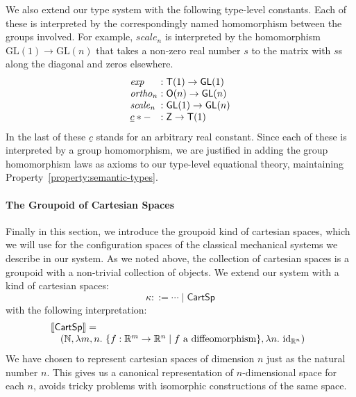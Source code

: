 \documentclass[preprint]{sigplanconf}
\newcommand{\sepbar}{\mathrel|}
\theoremstyle{examplestyle}
\newcommand{\sem}[1]{\llbracket #1 \rrbracket}
\begin{document}
We also extend our type system with the following type-level
constants. Each of these is interpreted by the correspondingly named
homomorphism between the groups involved. For example,
$\mathit{scale}_n$ is interpreted by the homomorphism $\mathrm{GL}(1)
\to \mathrm{GL}(n)$ that takes a non-zero real number $s$ to the
matrix with $s$s along the diagonal and zeros elsewhere.
\begin{displaymath}
  \begin{array}{l@{\hspace{0.3em}}c@{\hspace{0.3em}}l}
    \mathit{exp} &:& \mathsf{T}(1) \to \mathsf{GL}(1) \\
    \mathit{ortho}_n &:& \mathsf{O}(n) \to \mathsf{GL}(n) \\
    \mathit{scale}_n &:& \mathsf{GL}(1) \to \mathsf{GL}(n) \\
    \underline{c}*- &:& \mathsf{Z} \to \mathsf{T}(1) 
  \end{array}
\end{displaymath}
In the last of these $\underline{c}$ stands for an arbitrary real
constant.  Since each of these is interpreted by a group homomorphism,
we are justified in adding the group homomorphism laws as axioms to
our type-level equational theory, maintaining
Property~\ref{property:semantic-types}.

\paragraph{The Groupoid of Cartesian Spaces} Finally in this section,
we introduce the groupoid kind of cartesian spaces, which we will use
for the configuration spaces of the classical mechanical systems we
describe in our system. As we noted above, the collection of cartesian
spaces is a groupoid with a non-trivial collection of objects. We
extend our system with a kind of cartesian spaces:
\begin{displaymath}
  \kappa ::= \cdots \sepbar \mathsf{CartSp}
\end{displaymath}
with the following interpretation:
\begin{displaymath}
  \begin{array}{@{}l}
    \sem{\mathsf{CartSp}} = \\
    \quad (\mathbb{N}, \lambda m,n.~\{ f : \mathbb{R}^m \to \mathbb{R}^n \sepbar f\textrm{ a diffeomorphism}\}, \lambda n.~\mathrm{id}_{\mathbb{R}^n})
  \end{array}
\end{displaymath}
We have chosen to represent cartesian spaces of dimension $n$ just as
the natural number $n$. This gives us a canonical representation of
$n$-dimensional space for each $n$, avoids tricky problems with
isomorphic constructions of the same space.
\end{document}
